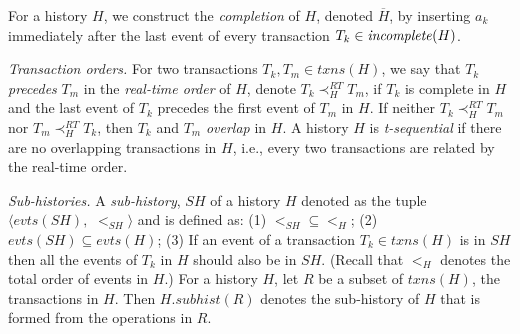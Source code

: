 \documentclass{llncs}
\newcommand{\cmnt}[1]{}
\newcommand{\Wset}{\textit{Wset}}
\newcommand{\id}[1]{\mbox{\textit{#1}}}\newcommand{\res}[1]{\mbox{\textbf{#1}}}
\newcommand{\op} {operation}
\newcommand{\txns}{\textit{txns}}
\newcommand{\evts}[1] {evts(#1)}
\newcommand{\ssch} {sub-history}
\newcommand{\shist}[2]  {#2.subhist(#1)}
\newcommand{\tryc} {\textit{tryC}}
\begin{document}
For a history $H$, we construct the \emph{completion} of $H$, denoted $\overline{H}$, 
by inserting $a_k$ immediately after the last event 
of every transaction $T_k\in\id{incomplete}(H)$.






\vspace{1mm}
\noindent
\textit{Transaction orders.} For two transactions $T_k,T_m \in \txns(H)$, we say that  $T_k$ \emph{precedes} $T_m$ in the \emph{real-time order} of $H$, denote $T_k\prec_H^{RT} T_m$, if $T_k$ is complete in $H$ and the last event of $T_k$ precedes the first event of $T_m$ in $H$. If neither $T_k\prec_H^{RT} T_m$ nor $T_m \prec_H^{RT} T_k$, then $T_k$ and $T_m$ \emph{overlap} in $H$. A history $H$ is \emph{t-sequential} if there are no overlapping
transactions in $H$, i.e., every two transactions are related by the real-time order.

\cmnt {
We now define two order relations
on the set of transactions that are going to be instrumental in our
further definitions: real-time order, and deferred-update order.

For $T_k,T_m \in \txns(H)$, we say that  $T_k$ \emph{precedes} $T_m$
in the \emph{deferred-update order} of $H$, denote $T_k\prec_{H}^{DU} T_m$, if
$T_k$ contains a read $r_k(x,v)$, $T_m$ is committed,
$x\in\Wset(T_m)$, and $r_k(x,v)<_H c_m$. 
}

\cmnt{
For two transactions $T_k$ and $T_m$ in $\txns(H)$, we say that \emph{$T_k$ precedes $T_m$ in conflict order}, denoted $T_k \prec_H^{CO} T_m$, if (1) w-w order: $\tryc_k(C)<_H \tryc_m(C)$ and $Wset(T_k) \cap Wset(T_m) \neq\emptyset$, (2) w-r order: $\tryc_k(C)<_H r_m(x,v)$ and $x \in Wset(T_k)$, or (3) r-w order: $r_k(x,v)<_H \tryc_m(C)$ and $x\in Wset(T_m)$.

It can be seen that for any history $H$, the real-time and conflict orders are the same for $H$ and $\overline{H}$, i.e. $\prec_H^{RT} = \prec_{\overline{H}}^{RT}$ and $\prec_H^{CO} = \prec_{\overline{H}}^{CO}$. 
}

\vspace{1mm}
\noindent
\textit{Sub-histories.} A \textit{sub-history}, $SH$ of a history
$H$ denoted as the tuple $\langle \evts{SH},$ $<_{SH}\rangle$ and is
defined as: (1) $<_{SH} \subseteq <_{H}$; (2) $\evts{SH} \subseteq
\evts{H}$; (3) If an event of a transaction $T_k \in \txns(H)$ is in $SH$ then all
the events of $T_k$ in $H$ should also be in $SH$.
(Recall that $<_H$ denotes the total order of events in $H$.) 
For a history
$H$, let $R$ be a subset of $txns(H)$, the transactions in
$H$. 
Then $\shist{R}{H}$ denotes  the \ssch{} of $H$ that is
formed  from the \op{s} in $R$. 
\end{document}
